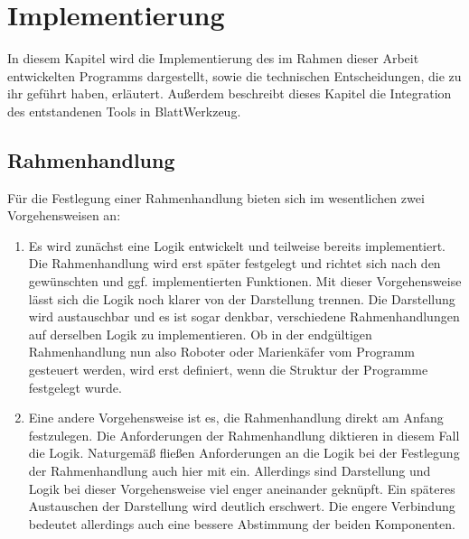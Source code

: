 \chapter{Implementierung}
\label{sec:implementation}

In diesem Kapitel wird die Implementierung des im Rahmen dieser Arbeit entwickelten Programms dargestellt, sowie die technischen Entscheidungen, die zu ihr geführt haben, erläutert. Außerdem beschreibt dieses Kapitel die Integration des entstandenen Tools in BlattWerkzeug.

\section{Rahmenhandlung}
\label{sec:implementation:story}

Für die Festlegung einer Rahmenhandlung bieten sich im wesentlichen zwei Vorgehensweisen an:

\begin{enumerate}[noitemsep]
  \item Es wird zunächst eine Logik entwickelt und teilweise bereits implementiert. Die Rahmenhandlung wird erst später festgelegt und richtet sich nach den gewünschten und ggf. implementierten Funktionen. Mit dieser Vorgehensweise lässt sich die Logik noch klarer von der Darstellung trennen. Die Darstellung wird austauschbar und es ist sogar denkbar, verschiedene Rahmenhandlungen auf derselben Logik zu implementieren. Ob in der endgültigen Rahmenhandlung nun also Roboter oder Marienkäfer vom Programm gesteuert werden, wird erst definiert, wenn die Struktur der Programme festgelegt wurde.
  \item Eine andere Vorgehensweise ist es, die Rahmenhandlung direkt am Anfang festzulegen. Die Anforderungen der Rahmenhandlung diktieren in diesem Fall die Logik. Naturgemäß fließen Anforderungen an die Logik bei der Festlegung der Rahmenhandlung auch hier mit ein. Allerdings sind Darstellung und Logik bei dieser Vorgehensweise viel enger aneinander geknüpft. Ein späteres Austauschen der Darstellung wird deutlich erschwert. Die engere Verbindung bedeutet allerdings auch eine bessere Abstimmung der beiden Komponenten.
\end{enumerate}


